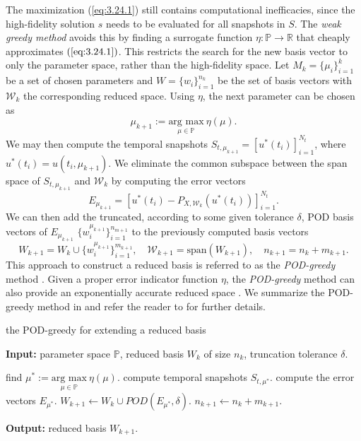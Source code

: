The maximization (\ref{eq:3.24.1}) still contains computational inefficacies, since the high-fidelity solution $s$ needs to be evaluated for all snapshots in $S$. The \emph{weak greedy method} avoids this by finding a surrogate function $\eta:\mathbb P \to \mathbb R$ that cheaply approximates $(\ref{eq:3.24.1})$. This restricts the search for the new basis vector to only the parameter space, rather than the high-fidelity space. Let $M_k=\{\mu_i\}_{i=1}^k$ be a set of chosen parameters and $W = \{ w_i\}_{i=1}^{n_k}$ be the set of basis vectors with $\mathcal W_k$ the corresponding reduced space. Using $\eta$, the next parameter can be chosen as
\begin{equation}
	\mu_{k+1} := \underset{\mu \in \mathbb P}{\text{arg\ max}} \ \eta(\mu).
\end{equation}
We may then compute the temporal snapshots $S_{t,\mu_{k+1}} = [ u^*(t_i) ]_{i=1}^{N_t}$, where $u^*(t_i) = u(t_i,\mu_{k+1})$. We eliminate the common subspace between the span space of $S_{t,\mu_{k+1}}$ and $\mathcal W_k$ by computing the error vectors 
\begin{equation}
	E_{\mu_{k+1}} = \left[ u^*(t_i) - P_{X,\mathcal W_k} (u^*(t_i)) \right]_{i=1}^{N_t}.
\end{equation}
We can then add the truncated, according to some given tolerance $\delta$, POD basis vectors of $E_{\mu_{k+1}}$ $\{w^{\mu_{k+1}}_i\}_{i=1}^{n_{m+1}}$ to the previously computed basis vectors
\begin{equation}
	W_{k+1} = W_{k} \cup \{w^{\mu_{k+1}}_i\}_{i=1}^{m_{k+1}}, \quad \mathcal W_{k+1} = \text{span}(W_{k+1}), \quad n_{k+1} = n_k + m_{k+1}.
\end{equation}
This approach to construct a reduced basis is referred to as the \emph{POD-greedy} method \cite{haasdonk2008reduced}. Given a proper error indicator function $\eta$, the \emph{POD-greedy} method can also provide an exponentially accurate reduced space \cite{haasdonk2008reduced,haasdonk2013convergence}. We summarize the POD-greedy method in  and refer the reader to \cite{hesthaven2015certified,haasdonk2013convergence} for further details.

\begin{algorithm} 
	\caption{the POD-greedy for extending a reduced basis} \label{alg:3.3.1}
	\textbf{Input:} parameter space $\mathbb P$, reduced basis $W_k$ of size $n_k$, truncation tolerance $\delta$.
	\begin{algorithmic} [1]
		\State find $\mu^* := \underset{\mu \in \mathbb P}{\text{arg\ max}} \ \eta(\mu)$.
		\State compute temporal snapshots $S_{t,\mu^*}$.
		\State compute the error vectors $E_{\mu^*}$.
		\State $W_{k+1} \leftarrow W_{k} \cup POD(E_{\mu^*},\delta)$.
		\State $n_{k+1} \leftarrow n_k + m_{k+1}$.
	\end{algorithmic}
	\vspace{0.5cm}
	\textbf{Output:} reduced basis $W_{k+1}$.
\end{algorithm}




